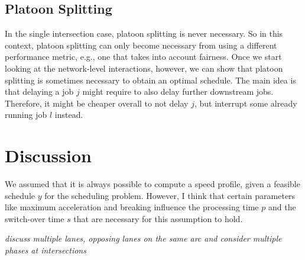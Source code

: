 \documentclass{article}
\theoremstyle{definition}
\theoremstyle{plain}
\begin{document}
\subsection{Platoon Splitting}

In the single intersection case, platoon splitting is never necessary. So in
this context, platoon splitting can only become necessary from using a different
performance metric, e.g., one that takes into account fairness. Once we start
looking at the network-level interactions, however, we can show that platoon
splitting is sometimes necessary to obtain an optimal schedule. The main idea is
that delaying a job $j$ might require to also delay further downstream jobs.
Therefore, it might be cheaper overall to not delay $j$, but interrupt some
already running job $l$ instead.


\section{Discussion}

We assumed that it is always possible to compute a speed profile, given a
feasible schedule $y$ for the scheduling problem. However, I think that certain
parameters like maximum acceleration and breaking influence the processing time
$p$ and the switch-over time $s$ that are necessary for this assumption to hold.

\vspace{0.5em}
\noindent
\textit{\color{blue}discuss multiple lanes, opposing lanes on the same arc and consider multiple phases at intersections}




\end{document}
